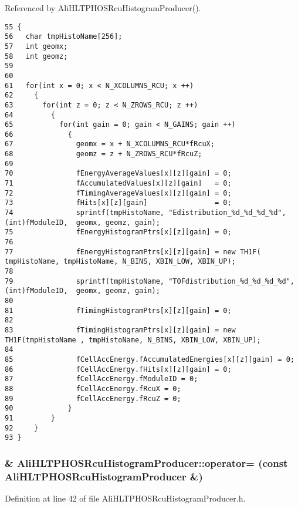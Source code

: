 Referenced by Ali\-HLTPHOSRcu\-Histogram\-Producer().

\footnotesize\begin{verbatim}55 {
56   char tmpHistoName[256];
57   int geomx;
58   int geomz;
59     
60 
61   for(int x = 0; x < N_XCOLUMNS_RCU; x ++)
62     {
63       for(int z = 0; z < N_ZROWS_RCU; z ++)
64         {
65           for(int gain = 0; gain < N_GAINS; gain ++)
66             {
67               geomx = x + N_XCOLUMNS_RCU*fRcuX;
68               geomz = z + N_ZROWS_RCU*fRcuZ;
69 
70               fEnergyAverageValues[x][z][gain] = 0; 
71               fAccumulatedValues[x][z][gain]   = 0;
72               fTimingAverageValues[x][z][gain] = 0; 
73               fHits[x][z][gain]                = 0;
74               sprintf(tmpHistoName, "Edistribution_%d_%d_%d_%d",(int)fModuleID,  geomx, geomz, gain);
75               fEnergyHistogramPtrs[x][z][gain] = 0;
76 
77               fEnergyHistogramPtrs[x][z][gain] = new TH1F( tmpHistoName, tmpHistoName, N_BINS, XBIN_LOW, XBIN_UP);
78 
79               sprintf(tmpHistoName, "TOFdistribution_%d_%d_%d_%d",(int)fModuleID,  geomx, geomz, gain);
80         
81               fTimingHistogramPtrs[x][z][gain] = 0;
82 
83               fTimingHistogramPtrs[x][z][gain] = new TH1F(tmpHistoName , tmpHistoName, N_BINS, XBIN_LOW, XBIN_UP);
84 
85               fCellAccEnergy.fAccumulatedEnergies[x][z][gain] = 0;
86               fCellAccEnergy.fHits[x][z][gain] = 0;
87               fCellAccEnergy.fModuleID = 0;
88               fCellAccEnergy.fRcuX = 0;
89               fCellAccEnergy.fRcuZ = 0; 
90             }
91         } 
92     } 
93 }
\end{verbatim}\normalsize 


\subsubsection{\& Ali\-HLTPHOSRcu\-Histogram\-Producer::operator= (const {\bf Ali\-HLTPHOSRcu\-Histogram\-Producer} \&)\hspace{0.3cm}{\tt  [inline, private]}}\label{classAliHLTPHOSRcuHistogramProducer_d1}




Definition at line 42 of file Ali\-HLTPHOSRcu\-Histogram\-Producer.h.

